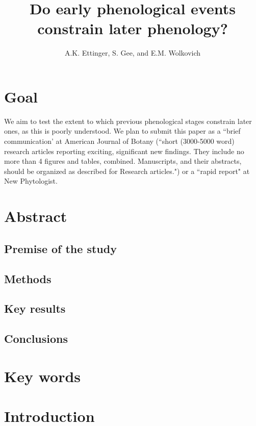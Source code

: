 \documentclass{article}
\begin{document}
 
\title{Do early phenological events constrain later phenology?} 
\author{A.K. Ettinger, S. Gee, and E.M. Wolkovich}
\maketitle  %

\section* {Goal}
\par We aim to test the extent to which previous phenological stages constrain later ones, as this is poorly understood. We plan to submit this paper as a ``brief communication' at American Journal of Botany (``short (3000-5000 word) research articles reporting exciting, significant new findings. They include no more than 4 figures and tables, combined. Manuscripts, and their abstracts, should be organized as described for Research articles.") or a ``rapid report" at New Phytologist.

\section*{Abstract}
\subsection*{Premise of the study}
\subsection*{Methods}
\subsection*{Key results}
\subsection*{Conclusions}
\section* {Key words}
\section* {Introduction}
\end{document}
